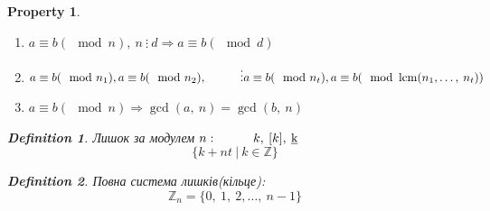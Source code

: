 \documentclass[a4paper,12pt, centered]{bookest}
\newtheorem{definition}{Definition}[section]
\newtheorem*{property*}{Property}
\DeclareMathOperator{\lcm}{lcm}
\newcommand\tab[1][1cm]{\hspace*{#1}}
\begin{document}
\begin{property*}
\begin{enumerate}
\begin{proof}
		\end{proof}
		\item $a\equiv b(\mod n),\>n\>\vdots\>d\Rightarrow a\equiv b(\mod d)$
		\item $a\equiv b(\mod n_1),\\ a\equiv b(\mod n_2),\\\tab\vdots\\a\equiv b(\mod n_t),\\a\equiv b(\mod \lcm(n_1,\dots,\>n_t))$
		\item $a\equiv b(\mod n)\Rightarrow\gcd(a,\>n)=\gcd(b,\>n)$
	\end{enumerate}
	\begin{definition}
		Лишок за модулем $n:\tab k,\>[k],\>\underbar{k}$ $$\{k+nt\>|\>k\in\mathbb{Z}	\}$$
	\end{definition}
	\begin{definition}
		Повна система лишків(кільце):$$ \mathbb{Z}_n=\{0,\>1,\>2,\dots,\>n-1\}$$
	\end{definition}
\end{property*}
\end{document}
